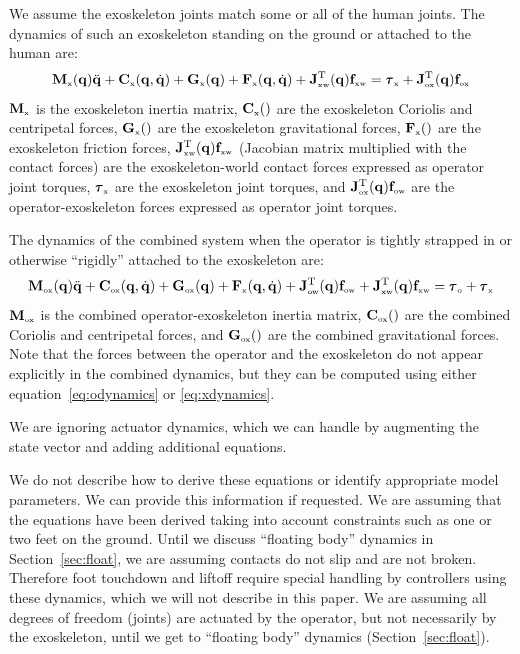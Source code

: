 \documentclass[letterpaper,12pt,fullpage]{article}
\newcommand{\myo}{{\mbox {\tiny o}}}
\newcommand{\myx}{{\mbox {\tiny x}}}
\newcommand{\ox}{{\mbox {\tiny ox}}}
\newcommand{\ow}{{\mbox {\tiny ow}}}
\newcommand{\xw}{{\mbox {\tiny xw}}}
\begin{document}
We assume the exoskeleton joints match some or all of the human joints.
The dynamics of such an exoskeleton standing on the ground or attached to
the human are:
\begin{equation}
\mM_{\myx}(\vq) \ddot{\vq} + \mC_{\myx}(\vq,\dot{\vq}) + \mG_{\myx}(\vq)
+ \mF_{\myx}(\vq,\dot{\vq})
+ \mJ_{\xw}^{\tr}(\vq) \vf_{\xw} = \vtau_{\myx} + \mJ_{\ox}^{\tr}(\vq) \vf_{\ox}
\label{eq:xdynamics}
\end{equation}
$\mM_{\myx}$ is the exoskeleton inertia matrix,
$\mC_{\myx}()$ are the exoskeleton Coriolis and centripetal forces,
$\mG_{\myx}()$ are the exoskeleton gravitational forces,
$\mF_{\myx}()$ are the exoskeleton friction forces,
$\mJ_{\xw}^{\tr}(\vq) \vf_{\xw}$ (Jacobian matrix multiplied with the
contact forces) are the exoskeleton-world
contact forces expressed as operator joint torques, 
$\vtau_{\myx}$ are the exoskeleton joint torques,
and 
$\mJ_{\ox}^{\tr}(\vq) \vf_{\ow}$
are the operator-exoskeleton forces expressed
as operator joint torques.

The dynamics of the combined system when the operator is tightly strapped in
or otherwise ``rigidly'' attached to the exoskeleton are:
\begin{equation}
\mM_{\ox}(\vq) \ddot{\vq} + \mC_{\ox}(\vq,\dot{\vq}) + \mG_{\ox}(\vq)
+ \mF_{\myx}(\vq,\dot{\vq})
+ \mJ_{\ow}^{\tr}(\vq) \vf_{\ow}
+ \mJ_{\xw}^{\tr}(\vq) \vf_{\xw} 
= \vtau_{\myo} + \vtau_{\myx}
\label{eq:oxdynamics}
\end{equation}
$\mM_{\ox}$ is the combined operator-exoskeleton inertia matrix,
$\mC_{\ox}()$ are the combined Coriolis and centripetal forces,
and $\mG_{\ox}()$ are the combined gravitational forces.
Note that the forces between the operator and the exoskeleton
do not appear explicitly in the
combined dynamics, but they can be computed using either equation~\ref{eq:odynamics}
or \ref{eq:xdynamics}.

We are ignoring actuator dynamics, which we can handle by augmenting 
the state vector and adding additional equations.

We do not describe how to derive these equations or identify appropriate 
model parameters.
We can provide this information if requested.
We are assuming that the equations have been derived taking into account constraints
such as one or two feet on the ground. Until we discuss ``floating body'' dynamics
in Section~\ref{sec:float}, we are assuming contacts do not slip and are not broken.
Therefore foot touchdown and liftoff require special handling by controllers
using these dynamics, which we will not describe in this paper.
We are assuming all degrees of freedom (joints) are actuated by the operator,
but not necessarily by the exoskeleton, until we get to 
``floating body'' dynamics (Section~\ref{sec:float}).
\end{document}
